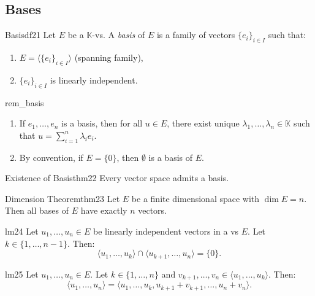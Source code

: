 \documentclass[11pt, a4paper]{article}
\newcommand{\K}{\mathbb{K}}
\begin{document}
\subsection{Bases}

\begin{definition}{Basis}{df21}
  Let $E$ be a $\K$-vs. A \emph{basis} of $E$ is a family of vectors $\{e_i\}_{i \in I}$ such that:
  \begin{enumerate}
    \item $E = \langle \{e_i\}_{i \in I} \rangle$ (spanning family),
    \item $\{e_i\}_{i \in I}$ is linearly independent.
  \end{enumerate}
\end{definition}

\begin{remark}{}{rem_basis}
  \begin{enumerate}
    \item If $e_1, \dots, e_n$ is a basis, then for all $u \in E$, there exist unique $\lambda_1, \dots, \lambda_n \in \K$ such that $u = \sum_{i=1}^n \lambda_i e_i$.
    \item By convention, if $E = \{0\}$, then $\emptyset$ is a basis of $E$.
  \end{enumerate}
\end{remark}

\begin{theorem}{Existence of Basis}{thm22}
  Every vector space admits a basis.
\end{theorem}

\begin{theorem}{Dimension Theorem}{thm23}
  Let $E$ be a finite dimensional space with $\dim E = n$. Then all bases of $E$ have exactly $n$ vectors.
\end{theorem}

\begin{lemma}{}{lm24}
  Let $u_1, \dots, u_n \in E$ be linearly independent vectors in a vs $E$. Let $k \in \{1, \dots, n-1\}$. Then:
  \[
    \langle u_1, \dots, u_k \rangle \cap \langle u_{k+1}, \dots, u_n \rangle = \{0\}.
  \]
\end{lemma}

\begin{lemma}{}{lm25}
  Let $u_1, \dots, u_n \in E$. Let $k \in \{1, \dots, n\}$ and $v_{k+1}, \dots, v_n \in \langle u_1, \dots, u_k \rangle$. Then:
  \[
    \langle u_1, \dots, u_n \rangle = \langle u_1, \dots, u_k, u_{k+1} + v_{k+1}, \dots, u_n + v_n \rangle.
  \]
\end{lemma}
\end{document}
